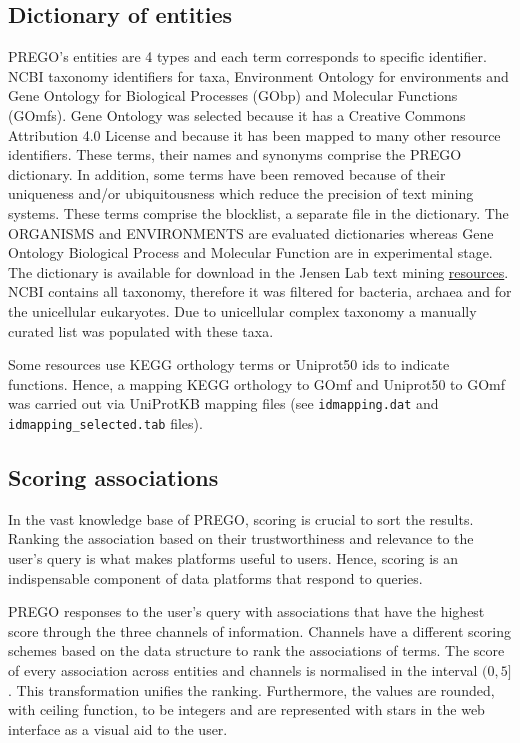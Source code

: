 \subsection{Dictionary of entities}
\label{subsec:prego-dict}

PREGO's entities are 4 types and each term corresponds to specific identifier. 
NCBI taxonomy identifiers for taxa, Environment Ontology for environments and
Gene Ontology for Biological Processes (GObp) and Molecular Functions (GOmfs).
Gene Ontology was selected because it has a Creative Commons Attribution 4.0 License
and because it has been mapped to many other resource identifiers.
These terms, their names and synonyms comprise the PREGO dictionary. In addition,
some terms have been removed because of their uniqueness and/or ubiquitousness which reduce the precision of text mining systems.
These terms comprise the blocklist, a separate file in the dictionary.
The ORGANISMS \parencite{pafilis2013species} and ENVIRONMENTS \parencite{pafilis2015environments} are evaluated dictionaries
whereas Gene Ontology Biological Process and Molecular Function are in experimental stage.
The dictionary is 
available for download in the Jensen Lab text mining \href{https://jensenlab.org/resources/textmining/#dictionaries}{resources}. 
NCBI contains all taxonomy, therefore it was filtered for bacteria, archaea and
for the unicellular eukaryotes. Due to unicellular complex taxonomy a manually curated
list was populated with these taxa.

Some resources use KEGG orthology terms or Uniprot50 ids to indicate functions. 
Hence, a mapping KEGG orthology to GOmf and Uniprot50 to GOmf was carried out via UniProtKB mapping files (see \texttt{idmapping.dat} and \texttt{idmapping\_selected.tab} files). 

\subsection{Scoring associations}
\label{scoring}

In the vast knowledge base of PREGO, scoring is crucial to sort 
the results. Ranking the association based on their trustworthiness and
relevance to the user's query is what makes platforms useful to users.
Hence, scoring is an indispensable component of data platforms 
that respond to queries.

PREGO responses to the user's query with associations that have the highest score
through the three channels of information. 
Channels have a different scoring schemes based on the data structure to
rank the associations of terms.
The score of every association across entities and channels is normalised in the interval $(0,5]$.
This transformation unifies the ranking.
Furthermore, the values are rounded, with ceiling function, to be integers
and are represented with stars in the web interface as a visual aid to the user.

